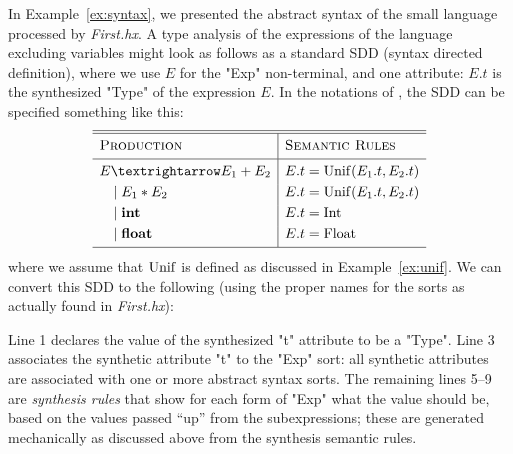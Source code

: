 \documentclass[11pt]{article} %
\begin{document}
\begin{example}\label{ex:collect}
  In Example~\ref{ex:syntax}, we presented the abstract syntax of the small language processed by
  \emph{First.hx}. A type analysis of the expressions of the language excluding variables might look
  as follows as a standard SDD (syntax directed definition), where we use $E$ for the "Exp"
  non-terminal, and one attribute: $E.t$ is the synthesized "Type" of the expression $E$.  In the
  notations of \cite{Aho+:2006}, the SDD can be specified something like this:
  \begin{equation*}
    \begin{array}{l|l}
      \hline
      \hline
      \textsc{Production}  & \textsc{Semantic Rules} \Bigstrut\\
      \hline
      E → E_1 + E_2 & E.t = \op{Unif}(E_1.t, E_2.t) \Bigstrut\\[\jot]
      \quad\mid E_1 \ast E_2 & E.t = \op{Unif}(E_1.t, E_2.t) \\[\jot]
      \quad\mid \textbf{int} & E.t = \op{Int} \\[\jot]
      \quad\mid \textbf{float} & E.t = \op{Float} \\[\jot]
      \hline
    \end{array}
  \end{equation*}
  where we assume that $\operatorname{Unif}$ is defined as discussed in Example~\ref{ex:unif}.
  We can convert this SDD to the following \HAX (using the proper names for the sorts as actually
  found in \emph{First.hx}):
  Line 1 declares the value of the synthesized "t" attribute to be a "Type".
  Line 3 associates the synthetic attribute "t" to the "Exp" sort: all synthetic attributes are
  associated with one or more abstract syntax sorts.
  The remaining lines 5--9 are \emph{synthesis rules} that show for each form of "Exp" what the
  value should be, based on the values passed ``up'' from the subexpressions; these are generated
  mechanically as discussed above from the synthesis semantic rules.
\end{example}
\end{document}
